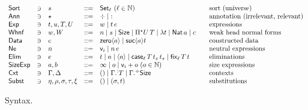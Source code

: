 \documentclass[acmlarge,review,anonymous]{acmart}\settopmatter{printfolios=true}
\begin{document}
\begin{figure}[htbp]
  \centering
\[
\begin{array}{lllrl@{\qquad}l}
\Sort & \ni & s
    & ::= & \Set[\ell] ~(\ell \in \NN)& \mbox{sort (universe)} \\
\Ann & \ni & \star & ::= & \erased \mid \noterased & \mbox{annotation (irrelevant, relevant)}\\
\Exp & \ni & t,u,T,U
    & ::= & w \mid t\,e & \mbox{expressions} \\
\Whnf & \ni & w, W
    & ::= & n \mid s \mid \Size \mid \epiT U T %
    \mid \lambda t%
    \mid \Nat a \mid c & \mbox{weak head normal forms} \\ %
\Data & \ni & c
   & ::= & \zero a \mid \suc a t & \mbox{constructed data} \\
\Ne & \ni & n
    & ::= & \ind i \mid n \, e & \mbox{neutral expressions} \\
\Elim & \ni & e
    & ::= & t \mid a \mid \ann a \mid \case[\ell] T {t_z} {t_s} \mid \fix[\ell] T t & \mbox{eliminations} \\
\SizeExp & \ni & a,b & ::= & \infty \mid o \mid \ind i + o ~(o \in \NN) & \mbox{size expressions} \\
\Cxt & \ni & \Gamma, \Delta & ::= & \cempty \mid \erext[\noterased] \Gamma T \mid \erext \Gamma \Size
   & \mbox{contexts} \\
\Subst & \ni & \eta,\rho,\sigma,\tau,\xi & ::= & \sempty \mid (\sigma,t)
  & \mbox{substitutions} \\
\end{array}
\]
  \caption{Syntax.}
  \label{fig:syntax}
\end{figure}
\end{document}
